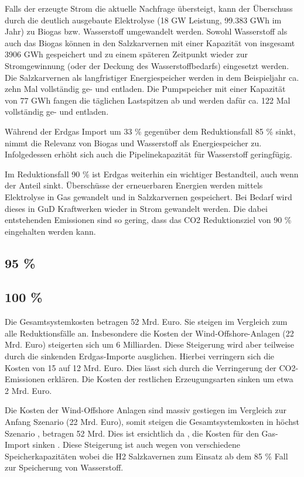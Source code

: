 
Falls der erzeugte Strom die aktuelle Nachfrage übersteigt, kann der Überschuss durch die deutlich ausgebaute Elektrolyse (18 GW Leistung, 99.383 GWh im Jahr) zu Biogas bzw. Wasserstoff umgewandelt werden. Sowohl Wasserstoff als auch das Biogas können in den Salzkarvernen mit einer Kapazität von insgesamt 3906 GWh gespeichert und zu einem späteren Zeitpunkt wieder zur Stromgewinnung (oder der Deckung des Wasserstoffbedarfs) eingesetzt werden. Die Salzkarvernen als langfristiger Energiespeicher werden in dem Beispieljahr ca. zehn Mal vollständig ge- und entladen. Die Pumpspeicher mit einer Kapazität von 77 GWh fangen die täglichen Lastspitzen ab und werden dafür ca. 122 Mal vollständig ge- und entladen.

Während der Erdgas Import um 33 \% gegenüber dem Reduktionsfall 85 \% sinkt, nimmt die Relevanz von Biogas und Wasserstoff als Energiespeicher zu. Infolgedessen erhöht sich auch die Pipelinekapazität für Wasserstoff geringfügig. 

Im Reduktionsfall 90 \% ist Erdgas weiterhin ein wichtiger Bestandteil, auch wenn der Anteil sinkt. Überschüsse der erneuerbaren Energien werden mittels Elektrolyse in Gas gewandelt und in Salzkarvernen gespeichert. Bei Bedarf wird dieses in GuD Kraftwerken wieder in Strom gewandelt werden. Die dabei entstehenden Emissionen sind so gering, dass das CO2 Reduktionsziel von 90 \% eingehalten werden kann. 

\subsection{95 \%}

\subsection{100 \%}
%
Die Gesamtsystemkosten betragen 52 Mrd. Euro. Sie steigen im Vergleich zum alle Reduktionsfälle an. Insbesondere die Kosten der Wind-Offshore-Anlagen (22 Mrd. Euro) steigerten sich um 6 Milliarden. Diese Steigerung wird aber teilweise durch die sinkenden Erdgas-Importe ausglichen. Hierbei verringern sich die Kosten von 15 auf 12 Mrd. Euro. Dies lässt sich durch die Verringerung der CO2-Emissionen erklären. Die Kosten der restlichen Erzeugungsarten sinken um etwa 2 Mrd. Euro.

Die Kosten der Wind-Offshore Anlagen sind massiv gestiegen im Vergleich zur Anfang Szenario (22 Mrd. Euro), somit steigen die Gesamtsystemkosten in höchst Szenario , betragen 52 Mrd. Dies ist ersichtlich da , die Kosten für den Gas-Import sinken . Diese Steigerung  ist auch wegen von verschiedene Speicherkapazitäten wobei die H2 Salzkavernen zum Einsatz ab dem 85 \% Fall zur Speicherung von Wasserstoff.

